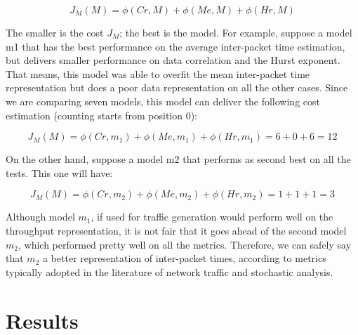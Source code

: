 \begin{equation}
\label{eq:cost-function}
J_M(M) = \phi(Cr, M) + \phi(Me, M) + \phi(Hr, M)
\end{equation}

The smaller is the cost $J_M$; the best is the model. For example, suppose a model m1 that has the best performance on the average inter-packet time estimation, but delivers smaller performance on data correlation and the Hurst exponent. That means, this model was able to overfit the mean inter-packet time representation but does a poor data representation on all the other cases. Since we are comparing seven models, this model can deliver the following cost estimation (counting starts from position 0):

\begin{equation}
\label{eq:cost-function-ex1}
J_M(M) = \phi(Cr, m_1) + \phi(Me, m_1) + \phi(Hr, m_1) = 6 + 0 + 6 = 12
\end{equation}

On the other hand, suppose a model m2 that performs as second best on all the tests. This one will have:

\begin{equation}
\label{eq:cost-function-ex2}
J_M(M) = \phi(Cr, m_2) + \phi(Me, m_2) + \phi(Hr, m_2) = 1 + 1 + 1 = 3
\end{equation}

Although model $m_1$, if used for traffic generation would perform well on the throughput representation, it is not fair that it goes ahead of the second model $m_2$, which performed pretty well on all the metrics. Therefore, we can safely say that  $m_2$ a better representation of inter-packet times, according to metrics typically adopted in the literature of network traffic and stochastic analysis. 


\section{Results}


